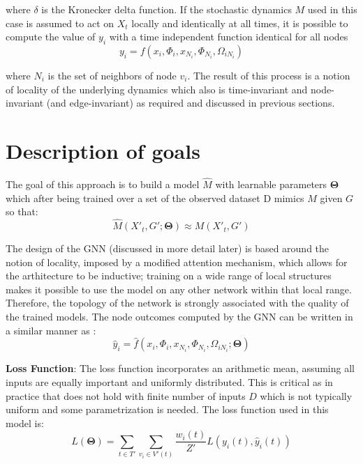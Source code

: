 where $\delta$ is the Kronecker delta function. If the stochastic dynamics
$M$ used in this case is assumed to act on $X_t$ locally and identically
at all times, it is possible to compute the value of $y_i$ with a time
independent function identical for all nodes
\begin{equation}
  \label{eq:y_indepe}
  y_i = f(x_i, \Phi_i, x_{N_i}, \Phi_{N_i}, \Omega_{iN_i})
\end{equation}

where $N_i$ is the set of neighbors of node $v_i$. The result of this
process is a notion of locality of the underlying dynamics which also
is time-invariant and node-invariant (and edge-invariant) as required
and discussed in previous sections.

\section{Description of goals}
The goal of this approach is to build a model $\hat{M}$ with learnable
parameters $\bm{\Theta}$ which after being trained over a set of the
observed dataset D mimics $M$ given $G$ so that:
\begin{equation}
  \label{eq:M_mimicks}
  \hat{M}(X'_t, G'; \bm{\Theta}) \approx M(X'_t, G')
\end{equation}

The design of the GNN (discussed in more detail later) is based around
the notion of locality, imposed by a modified attention mechanism, which
allows for the arthitecture to be inductive; training on a wide range of
local structures makes it possible to use the model on any other network within
that local range. Therefore, the topology of the network is strongly associated
with the quality of the trained models. The node outcomes computed by the GNN
can be written in a similar manner as :
\begin{equation}
  \label{eq:outcomes_y}
  \hat{y}_i = \hat{f}(x_i, \Phi_i, x_{N_i}, \Phi_{N_i}, \Omega_{iN_i}; \bm{\Theta})
\end{equation}

\textbf{Loss Function}: The loss function incorporates an arithmetic mean,
assuming all inputs are equally important and uniformly distributed. This is
critical as in practice that does not hold with finite number of inputs $D$ which
is not typically uniform and some parametrization is needed. The loss function
used in this model is:
\begin{equation}
  \label{eq:loss_func}
  L(\bm{\Theta}) = \sum_{t \in T'} \sum_{v_i \in V'(t)} \frac{w_i(t)}{Z'}L(y_i(t), \hat{y}_i(t))
\end{equation}

